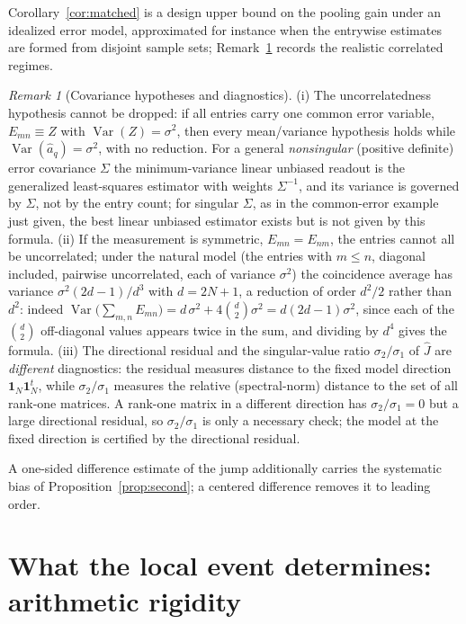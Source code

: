 \documentclass[11pt]{article}
\theoremstyle{plain}
\theoremstyle{definition}
\theoremstyle{remark}
\newtheorem{remark}[theorem]{Remark}
\newcommand{\one}{\mathbf 1}
\begin{document}
\noindent Corollary~\ref{cor:matched} is a design upper bound on the pooling
gain under an idealized error model, approximated for instance when the
entrywise estimates are formed from disjoint sample sets;
Remark~\ref{rem:covariance} records the realistic correlated regimes.

\begin{remark}[Covariance hypotheses and diagnostics]\label{rem:covariance}
(i) The uncorrelatedness hypothesis cannot be dropped: if all entries carry one
common error variable, $E_{mn}\equiv Z$ with $\operatorname{Var}(Z)=\sigma^2$,
then every mean/variance hypothesis holds while
$\operatorname{Var}(\widehat a_q)=\sigma^2$, with no reduction. For a general
\emph{nonsingular} (positive definite) error covariance $\Sigma$ the
minimum-variance linear unbiased readout is the
generalized least-squares estimator with weights $\Sigma^{-1}$, and its variance
is governed by $\Sigma$, not by the entry count; for singular $\Sigma$, as in
the common-error example just given, the best linear unbiased estimator exists
but is not given by this formula. (ii) If the measurement is
symmetric, $E_{mn}=E_{nm}$, the entries cannot all be uncorrelated; under the
natural model (the entries with $m\le n$, diagonal included, pairwise
uncorrelated, each of variance
$\sigma^2$) the coincidence average has variance $\sigma^2(2d-1)/d^{3}$ with
$d=2N+1$, a reduction of order $d^{2}/2$ rather than $d^{2}$: indeed
$\operatorname{Var}\bigl(\sum_{m,n}E_{mn}\bigr)
=d\,\sigma^2+4\binom d2\sigma^2=d(2d-1)\sigma^2$, since each of the $\binom d2$
off-diagonal values appears twice in the sum, and dividing by $d^4$ gives the
formula. (iii) The
directional residual and the singular-value ratio $\sigma_2/\sigma_1$ of
$\widehat J$ are \emph{different} diagnostics: the residual measures distance to
the fixed model direction $\one_N\one_N^t$, while $\sigma_2/\sigma_1$ measures
the relative (spectral-norm)
distance to the set of all rank-one matrices. A rank-one matrix in a different
direction has $\sigma_2/\sigma_1=0$ but a large directional residual, so
$\sigma_2/\sigma_1$ is only a necessary check; the model at the fixed direction
is certified by the directional residual.
\end{remark}

\noindent A one-sided difference estimate of the jump additionally carries the
systematic bias of Proposition~\ref{prop:second}; a centered difference removes it
to leading order.

\section{What the local event determines: arithmetic rigidity}\label{sec:rigidity}
\end{document}
